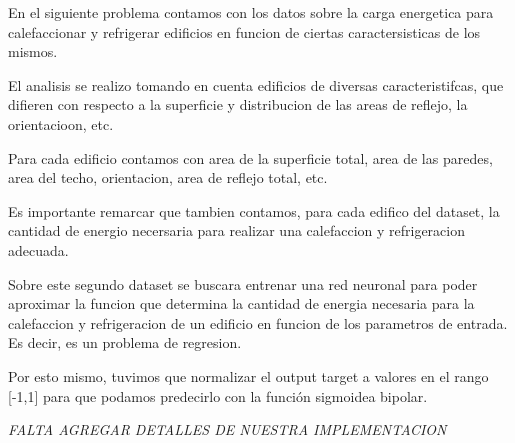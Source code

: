 En el siguiente problema contamos con los datos sobre la carga energetica para calefaccionar y refrigerar edificios en funcion de ciertas caractersisticas de los mismos.

El analisis se realizo tomando en cuenta edificios de diversas caracteristifcas, que difieren con respecto a la superficie y distribucion de las areas de reflejo, la orientacioon, etc.

Para cada edificio contamos con area de la superficie total, area de las paredes, area del techo, orientacion, area de reflejo total, etc.

Es importante remarcar que tambien contamos, para cada edifico del dataset, la cantidad de energio necersaria para realizar una calefaccion y refrigeracion adecuada.

Sobre este segundo dataset se buscara entrenar una red neuronal para poder aproximar la funcion que determina la cantidad de energia necesaria para
la calefaccion y refrigeracion de un edificio en funcion de los parametros de entrada. Es decir, es un problema de regresion.

Por esto mismo, tuvimos que normalizar el output target a valores en el rango [-1,1] para que podamos predecirlo con la función sigmoidea bipolar.

\emph{\color{red} FALTA AGREGAR DETALLES DE NUESTRA IMPLEMENTACION}